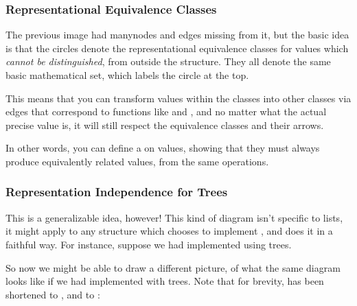 \documentclass[aspectratio=169, handout]{beamer}
\begin{document}
\begin{frame}[fragile]
  \frametitle{Representational Equivalence Classes}

  \ptmt

  The previous image had many\footnotemark nodes and edges missing from it,
  but the basic idea is that the circles denote the representational equivalence
  classes for values which \textit{cannot be distinguished}, from outside
  the structure. They all denote the same basic mathematical set, which labels
  the circle at the top.

  \pause
  \vspace{\fill}

  This means that you can transform values within the classes into other classes
  via edges that correspond to functions like  and
  , and no matter what the actual precise value is, it
  will still respect the equivalence classes and their arrows.

  \pause
  \vspace{\fill}

  In other words, you can define a  on values, showing that
  they must always produce equivalently related values, from the same
  operations.

\end{frame}

\begin{frame}[fragile]
  \frametitle{Representation Independence for Trees}

  This is a generalizable idea, however! This kind of diagram isn't
  specific to lists, it might apply to any structure which chooses to
  implement , and does it in a faithful way. For instance,
  suppose we had implemented  using trees.

  \pause
  \vspace{\fill}

  So now we might be able to draw a different picture, of what the same
  diagram looks like if we had implemented  with trees. Note
  that for brevity,  has been shortened to , and
   to :
\end{frame}
\end{document}
